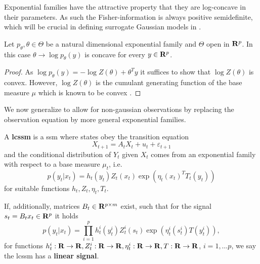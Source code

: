 \begin{definition}

\end{definition}
    
Exponential families have the attractive property that they are log-concave in their parameters. As such the Fisher-information is always positive semidefinite, which will be crucial in defining surrogate Gaussian models in .
\begin{lemma}
    Let $p_{\theta}, \theta \in \Theta$ be a natural dimensional exponential family and $\Theta$ open in $\mathbf R^{p}$. In this case $\theta \to \log p_{\theta}(y)$ is concave for every $y \in \mathbf R^{p}$.
\end{lemma}

\begin{proof}
    As $\log p_{\theta}(y) = - \log Z(\theta) + \theta^{T} y$ it suffices to show that $\log Z(\theta)$ is convex. However, $\log Z(\theta)$ is the cumulant generating function of the base measure $\mu$ which is known to be convex .
\end{proof}

We now generalize  to allow for non-gaussian observations by replacing the observation equation  by more general exponential families.

\begin{definition}
    A \textbf{\acrfull{lcssm}} is a \gls{ssm} where states obey the transition equation 
    $$
    X_{t + 1} = A_{t}X_{t} + u_{t} + \varepsilon_{t + 1}
    $$
    and the conditional distribution of $Y_{t}$ given $X_{t}$ comes from an exponential family with respect to a base measure $\mu_{t}$, i.e.
    $$
    p (y_{t}|x_{t}) = h_{t}(y_{t}) Z_{t}(x_{t}) \exp \left( \eta_{t}(x_{t})^{T} T_{t}(y_{t}) \right)
    $$
    for suitable functions $h_{t}, Z_{t}, \eta_{t}, T_{t}$. 

    If, additionally, matrices $B_{t} \in \mathbf R^{p \times m}$ exist, such that for the signal $s_{t} = B_{t}x_{t} \in \mathbf R^{p}$ it holds
    $$
    p(y_{t}|x_{t}) = \prod_{i =1}^p h^{i}_{t}(y^{i}_{t}) Z^{i}_{t} (s_{t}) \exp \left( \eta^{i}_{t} (s^{i}_{t}) T(y^{i}_{t}) \right),
    $$
    for functions $h_{t}^{i}: \mathbf R \to \mathbf R, Z^{i}_{t}: \mathbf R \to \mathbf R, \eta^{i}_{t}: \mathbf R\to\mathbf R, T: \mathbf R\to\mathbf R$, $i = 1, \dots p$, we say the \gls{lcssm} has a \textbf{linear signal}.

\end{definition}

